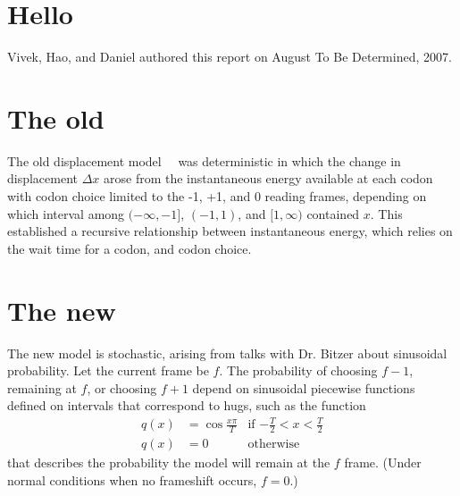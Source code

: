 \documentclass[10pt,titlepage,twocolumn, draft]{article}
\begin{document}
\section*{Hello}
Vivek, Hao, and Daniel authored this report on August To Be Determined, 2007.

\section{The old}
The old displacement model~\cite{lalit:mechanics}~\cite{lalit:embs} was deterministic
in which the change in displacement $\Delta x$ arose from the instantaneous energy available at
each codon with codon choice limited to the -1, +1, and 0 reading frames, depending on
which interval among $(-\infty, -1]$, $(-1,1)$, and $[1, \infty)$ contained $x$.
This established a recursive relationship between instantaneous energy,
which relies on the wait time for a codon, and codon choice.

\section{The new}
The new model is stochastic, arising from talks with Dr. Bitzer about sinusoidal probability.
Let the current frame be $f$. The probability of choosing
$f-1$, remaining at $f$, or choosing $f+1$ depend on sinusoidal piecewise functions defined
on intervals that correspond to hugs, such as the function
    \begin{align}
        q(x) &=  \cos \frac{x \pi}{T}  & \text{if $-\frac{T}{2} < x < \frac{T}{2}$}\\
        q(x) &=  0 & \text{otherwise}
    \end{align}
that describes the probability the model will remain at the $f$ frame. (Under normal conditions
when no frameshift occurs, $f = 0$.)


\end{document}
